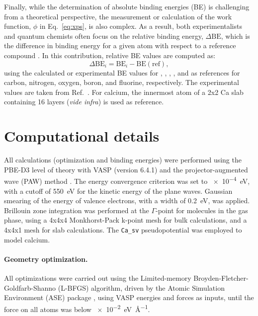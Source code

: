 \documentclass[journal=jpccck,manuscript=article]{achemso}
\begin{document}
Finally, while the determination of absolute binding energies (BE) is challenging from a theoretical perspective, the measurement or calculation of the work function, $\phi$ in Eq.~\eqref{eq:xps}, is also complex. As a result, both experimentalists and quantum chemists often focus on the relative binding energy, $\Delta\text{BE}$, which is the difference in binding energy for a given atom with respect to a reference compound \cite{vinesPredictionCoreLevel2018}. In this contribution, relative BE values are computed as:\begin{equation}
	\Delta\text{BE}_i = \text{BE}_i - \text{BE}(\text{ref}), \label{eq:dbe}
\end{equation} 
using the calculated or experimental BE values for , , , , and  as references for carbon, nitrogen, oxygen, boron, and fluorine, respectively. The experimental values are taken from Ref.~. For calcium, the innermost atom of a 2x2 Ca slab containing 16 layers (\textit{vide infra}) is used as reference.

	
\section{Computational details}

All calculations (optimization and binding energies) were performed using the PBE-D3 level of theory with VASP (version 6.4.1) and the projector-augmented wave (PAW) method \cite{blochlProjectorAugmentedwaveMethod1994}. The energy convergence criterion was set to \SI{e-4}{\electronvolt}, with a cutoff of \SI{550}{\electronvolt} for the kinetic energy of the plane waves. Gaussian smearing of the energy of valence electrons, with a width of \SI{0.2}{\electronvolt}, was applied. Brillouin zone integration was performed at the $\Gamma$-point for molecules in the gas phase, using a 4x4x4 Monkhorst-Pack k-point mesh\cite{monkhorstSpecialPointsBrillouinzone1976} for bulk calculations, and a 4x4x1 mesh for slab calculations. The \texttt{Ca\_sv} pseudopotential\cite{blochlProjectorAugmentedwaveMethod1994,kresseUltrasoftPseudopotentialsProjector1999} was employed to model calcium.

\paragraph{Geometry optimization.} All optimizations were carried out using the Limited-memory Broyden-Fletcher-Goldfarb-Shanno  (L-BFGS) algorithm, driven by the Atomic Simulation Environment (ASE) package \cite{larsenAtomicSimulationEnvironment2017}, using VASP energies and forces as inputs, until the force on all atoms was below \SI{e-2}{\electronvolt\per\angstrom}.
\end{document}
